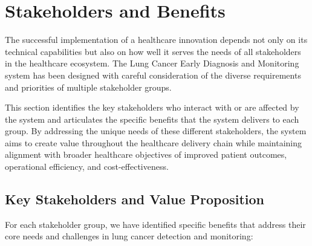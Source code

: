 \section{Stakeholders and Benefits}

The successful implementation of a healthcare innovation depends not only on its technical capabilities but also on how well it serves the needs of all stakeholders in the healthcare ecosystem. The Lung Cancer Early Diagnosis and Monitoring system has been designed with careful consideration of the diverse requirements and priorities of multiple stakeholder groups.

This section identifies the key stakeholders who interact with or are affected by the system and articulates the specific benefits that the system delivers to each group. By addressing the unique needs of these different stakeholders, the system aims to create value throughout the healthcare delivery chain while maintaining alignment with broader healthcare objectives of improved patient outcomes, operational efficiency, and cost-effectiveness.

\subsection{Key Stakeholders and Value Proposition}

For each stakeholder group, we have identified specific benefits that address their core needs and challenges in lung cancer detection and monitoring:

